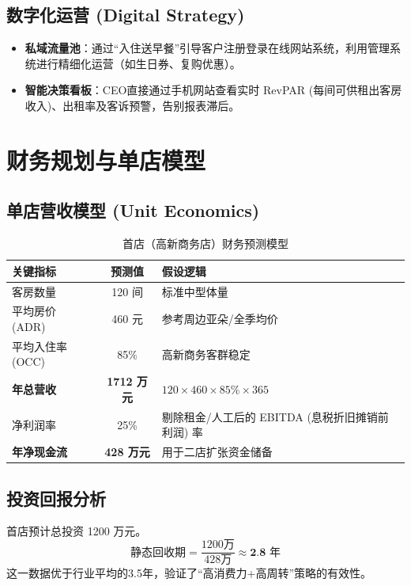 \documentclass{cumcmthesis}
\begin{document}
\subsection{数字化运营 (Digital Strategy)}
\begin{itemize}
    \item \textbf{私域流量池}：通过“入住送早餐”引导客户注册登录在线网站系统，利用管理系统进行精细化运营（如生日券、复购优惠）。
    \item \textbf{智能决策看板}：CEO直接通过手机网站查看实时 RevPAR (每间可供租出客房收入)、出租率及客诉预警，告别报表滞后。
\end{itemize}

\section{财务规划与单店模型}

\subsection{单店营收模型 (Unit Economics)}
\begin{table}[H]
    \centering
    \caption{首店（高新商务店）财务预测模型}
    \begin{tabular}{l c l}
        \toprule
        \textbf{关键指标} & \textbf{预测值} & \textbf{假设逻辑} \\
        \midrule
        客房数量 & 120 间 & 标准中型体量 \\
        平均房价 (ADR) & 460 元 & 参考周边亚朵/全季均价 \\
        平均入住率 (OCC) & 85\% & 高新商务客群稳定 \\
        \textbf{年总营收} & \textbf{1712 万元} & $120 \times 460 \times 85\% \times 365$ \\
        净利润率 & 25\% & 剔除租金/人工后的 EBITDA (息税折旧摊销前利润) 率 \\
        \textbf{年净现金流} & \textbf{428 万元} & 用于二店扩张资金储备 \\
        \bottomrule
    \end{tabular}
\end{table}

\subsection{投资回报分析}
首店预计总投资 1200 万元。
\[
\text{静态回收期} = \frac{\text{1200万}}{\text{428万}} \approx \textbf{2.8 年}
\]
这一数据优于行业平均的3.5年，验证了“高消费力+高周转”策略的有效性。
\end{document}
